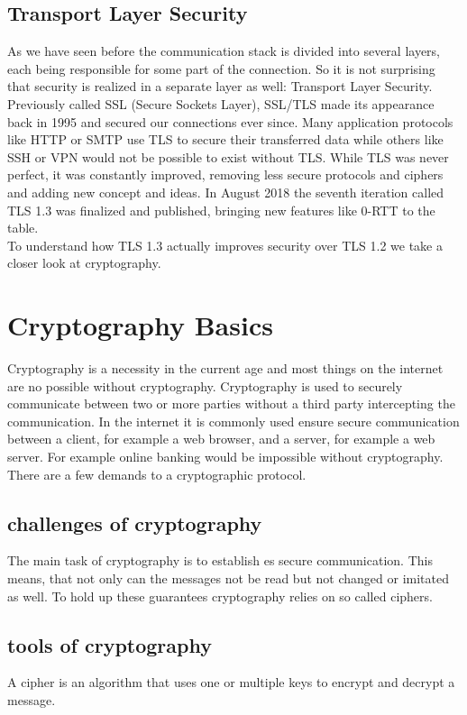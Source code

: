 \documentclass[a4paper,conference]{IEEEtran}
\begin{document}
\subsection{Transport Layer Security}
As we have seen before the communication stack is divided into several layers, each being responsible for some part of the connection. So it is not surprising that security is realized in a separate layer as well: Transport Layer Security. Previously called SSL (Secure Sockets Layer), SSL/TLS made its appearance back in 1995 and secured our connections ever since. Many application protocols like HTTP or SMTP use TLS to secure their transferred data while others like SSH or VPN would not be possible to exist without TLS. While TLS was never perfect, it was constantly improved, removing less secure protocols and ciphers and adding new concept and ideas. In August 2018 the seventh iteration called TLS 1.3 was finalized and published, bringing new features like 0-RTT to the table. \\
To understand how TLS 1.3 actually improves security over TLS 1.2 we take a closer look at cryptography.

\section{Cryptography Basics}
Cryptography is a necessity in the current age and most things on the internet are no possible without cryptography. Cryptography is used to securely communicate between two or more parties without a third party intercepting the communication. In the internet it is commonly used ensure secure communication between a client, for example a web browser, and a server, for example a web server. For example online banking would be impossible without cryptography.\\
There are a few demands to a cryptographic protocol.\\

\subsection{challenges of cryptography}
The main task of cryptography is to establish es secure communication. This means, that not only can the messages not be read but not changed or imitated as well. To hold up these guarantees cryptography relies on so called ciphers.
\subsection{tools of cryptography}
A cipher is an algorithm that uses one or multiple keys to encrypt and decrypt a message.
\end{document}
